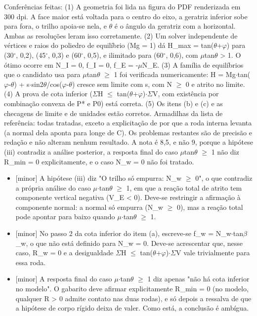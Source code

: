 \documentclass{article}%
\begin{document}
Conferências feitas: (1) A geometria foi lida na figura do PDF renderizada em 300 dpi. A face maior está voltada para o centro do eixo, a geratriz inferior sobe para fora, o trilho apoia{-}se nela, e $\theta$ é o ângulo da geratriz com a horizontal. Ambas as resoluções leram isso corretamente. (2) Um solver independente de vértices e raios do poliedro de equilíbrio (Mg = 1) dá H\_max = tan($\theta$+$\varphi$) para (30$^\circ$, 0,2), (45$^\circ$, 0,3) e (60$^\circ$, 0,5), e ilimitado para (60$^\circ$, 0,6), com $\mu$tan$\theta$ > 1. O ótimo ocorre em N\_I = 0, f\_I = 0, f\_E = -$\mu$N\_E. (3) A família de equilíbrios que o candidato usa para $\mu$tan$\theta$ $\geq$ 1 foi verificada numericamente: H = Mg$\cdot$tan($\varphi$-$\theta$) + s$\cdot$sin2$\theta$/cos($\varphi$-$\theta$) cresce sem limite com s, com N $\geq$ 0 e atrito no limite. (4) A prova de cota inferior ($\Sigma$H $\leq$ tan($\theta$+$\varphi$)$\cdot$$\Sigma$V, com existência por combinação convexa de P* e P0) está correta. (5) Os itens (b) e (c) e as checagens de limite e de unidades estão corretos.\newline%
\newline%
Armadilhas da lista de referência: todas tratadas, exceto a explicitação de por que a roda interna levanta (a normal dela aponta para longe de C). Os problemas restantes são de precisão e redação e não alteram nenhum resultado. A nota é 8,5, e não 9, porque a hipótese (iii) contradiz a análise posterior, a resposta final do caso $\mu$tan$\theta$ $\geq$ 1 não diz R\_min = 0 explicitamente, e o caso N\_w = 0 não foi tratado.%
\begin{itemize}%
\item%
{[}minor{]} A hipótese (iii) diz "O trilho só empurra: N\_w $\geq$ 0", o que contradiz a própria análise do caso $\mu$$\cdot$tan$\theta$ $\geq$ 1, em que a reação total de atrito tem componente vertical negativa (V\_E < 0). Deve{-}se restringir a afirmação à componente normal: a normal só empurra (N\_w $\geq$ 0), mas a reação total pode apontar para baixo quando $\mu$$\cdot$tan$\theta$ $\geq$ 1.%
\item%
{[}minor{]} No passo 2 da cota inferior do item (a), escreve{-}se f\_w = N\_w$\cdot$tan$\beta$\_w, o que não está definido para N\_w = 0. Deve{-}se acrescentar que, nesse caso, R\_w = 0 e a desigualdade $\Sigma$H $\leq$ tan($\theta$+$\varphi$)$\cdot$$\Sigma$V vale trivialmente para essa roda.%
\item%
{[}minor{]} A resposta final do caso $\mu$$\cdot$tan$\theta$ $\geq$ 1 diz apenas "não há cota inferior no modelo". O gabarito deve afirmar explicitamente R\_min = 0 (no modelo, qualquer R > 0 admite contato nas duas rodas), e só depois a ressalva de que a hipótese de corpo rígido deixa de valer. Como está, a conclusão é ambígua.%

\end{itemize}$$
\end{document}
